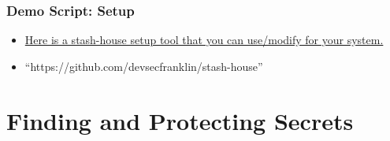 \documentclass[aspectratio=169]{beamer}
\makeatletter
\def\sectionsubtitle#1{\gdef\@sectionsubtitle{#1}}
\gdef\@sectionsubtitle{}
\makeatother
\begin{document}
\begin{frame}
    \frametitle{Demo Script: Setup}
    \begin{itemize}
        \item \href{ https://github.com/devsecfranklin/stash-house/blob/main/bin/install-client.sh }{Here is a stash-house setup tool that you can use/modify for your system. }
        \item ``https://github.com/devsecfranklin/stash-house''
    \end{itemize}
\end{frame}


{
\sectionsubtitle{\textcolor{black}{What is it you want to protect?}}
\section{Finding and Protecting Secrets}
}
\end{document}
